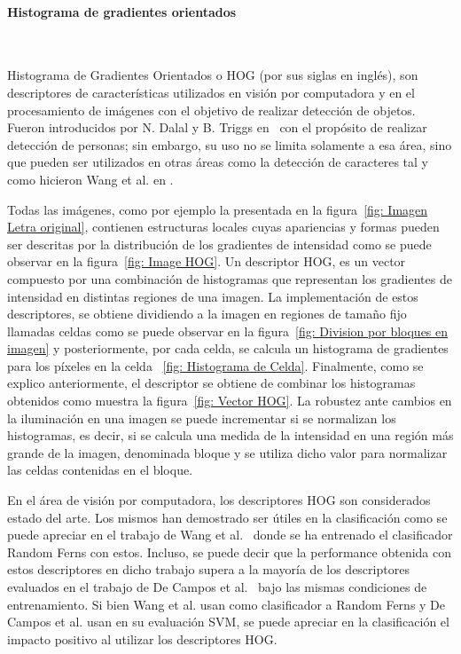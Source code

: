 \paragraph{Histograma de gradientes orientados} ~\\
\label{subsection:hog}

	Histograma de Gradientes Orientados o HOG (por sus siglas en inglés), son descriptores de características utilizados en visión por computadora y en el procesamiento de imágenes con el objetivo de realizar detección de objetos. Fueron introducidos por N. Dalal y B. Triggs en~\cite{DT05} con el propósito de realizar detección de personas; sin embargo, su uso no se limita solamente a esa área, sino que pueden ser utilizados en otras áreas como la detección de caracteres tal y como hicieron Wang et al. en \cite{wang}.
	
	Todas las imágenes, como por ejemplo la presentada en la figura~\ref{fig: Imagen Letra original}, contienen estructuras locales cuyas apariencias y formas pueden ser descritas por la distribución de los gradientes de intensidad como se puede observar en la figura~\ref{fig: Image HOG}.	Un descriptor HOG, es un vector compuesto por una combinación de histogramas que representan los gradientes de intensidad en distintas regiones de una imagen. La implementación de estos descriptores, se obtiene dividiendo a la imagen en regiones de tamaño fijo llamadas celdas como se puede observar en la figura~\ref{fig: Division por bloques en imagen} y posteriormente, por cada celda, se calcula un histograma de gradientes para los píxeles en la celda ~\ref{fig: Histograma de Celda}. Finalmente, como se explico anteriormente, el descriptor se obtiene de combinar los histogramas obtenidos como muestra la figura~\ref{fig: Vector HOG}. La robustez ante cambios en la iluminación en una imagen se puede incrementar si se normalizan los histogramas, es decir, si se calcula una medida de la intensidad en una región más grande de la imagen, denominada bloque y se utiliza dicho valor para normalizar las celdas contenidas en el bloque.
	
	
	En el área de visión por computadora, los descriptores HOG son considerados estado del arte. Los mismos han demostrado ser útiles en la clasificación como se puede apreciar en el trabajo de Wang et al.~\cite{wang} donde se ha entrenado el clasificador Random Ferns con estos. Incluso, se puede decir que la performance obtenida con estos descriptores en dicho trabajo supera a la mayoría de los descriptores evaluados en el trabajo de De Campos et al.~\cite{dCBV09} bajo las mismas condiciones de entrenamiento. Si bien Wang et al. usan como clasificador a Random Ferns y De Campos et al. usan en su evaluación SVM, se puede apreciar en la clasificación el impacto positivo al utilizar los descriptores HOG.
	
